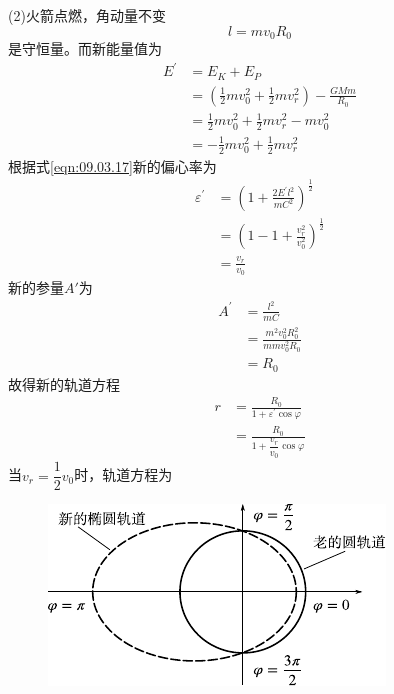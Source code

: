 (2)火箭点燃，角动量不变
\begin{equation*}
  l = m v _ { 0 } R _ { 0 }
\end{equation*}
是守恒量。而新能量值为
\begin{equation*}
  \begin{split}
    E ^ { \prime } &= E _ { K } + E _ { P } \\
    &= \left( \frac { 1 } { 2 } m v _ 0 ^ { 2 } + \frac { 1 } { 2 } m v _ r ^ { 2 } \right) - \frac { G M m } { R _ { 0 } } \\
    &= \frac { 1 } { 2 } m v _ 0 ^ { 2 } + \frac { 1 } { 2 } m v _ r ^ { 2 } - m v _ 0 ^ { 2 } \\
    &= - \frac { 1 } { 2 } m v _ 0 ^ { 2 } + \frac { 1 } { 2 } m v _ r ^ { 2 }
  \end{split}
\end{equation*}
根据式\eqref{eqn:09.03.17}新的偏心率为
\begin{equation*}
  \begin{split}
    \varepsilon ^ { \prime } &= \left( 1 + \frac { 2 E ^ { \prime } l ^ { 2 } } { m C ^ { 2 } } \right) ^ { \frac { 1 } { 2 } } \\
    &= \left( 1 - 1 + \frac { v _ { r } ^ { 2 } } { v _ 0 ^ { 2 } } \right) ^ { \frac { 1 } { 2 } } \\
    &= \frac { v _ { r } } { v _ { 0 } }
  \end{split}
\end{equation*}
新的参量$ A ' $为
\begin{equation*}
  \begin{split}
    A ^ { \prime } &= \frac { l ^ { 2 } } { m C } \\
    &= \frac { m ^ { 2 } v _ 0 ^ { 2 } R _ 0 ^ { 2 } } { m m v _ 0 ^ { 2 } R _ { 0 } } \\
    &= R _ { 0 }
  \end{split}
\end{equation*}
故得新的轨道方程
\begin{equation*}
  \begin{split}
    r &= \frac { R _ { 0 } } { 1 + \varepsilon ^ { \prime } \cos \varphi } \\
    &= \frac { R _ { 0 } } { 1 + \dfrac {  v _ { r } } { v _ { 0 } } \cos \varphi }
  \end{split}
\end{equation*}
当$ v _ { r } = \dfrac { 1 } { 2 } v _ { 0 } $时，轨道方程为
\vspace{-0.5em}
\begin{figure}[h]
  \centering
  \includegraphics{figure/fig09.08}
  \caption{}
  \label{fig:09.08}
\end{figure}
